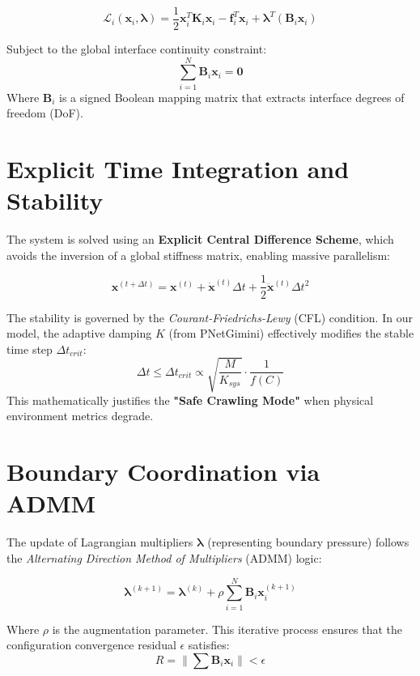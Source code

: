 \documentclass{article}
\begin{document}
\begin{equation}
\mathcal{L}_i(\mathbf{x}_i, \bm{\lambda}) = \frac{1}{2}\mathbf{x}_i^T \mathbf{K}_i \mathbf{x}_i - \mathbf{f}_i^T \mathbf{x}_i + \bm{\lambda}^T (\mathbf{B}_i \mathbf{x}_i)
\end{equation}

Subject to the global interface continuity constraint:
\begin{equation}
\sum_{i=1}^{N} \mathbf{B}_i \mathbf{x}_i = \mathbf{0}
\end{equation}
Where $\mathbf{B}_i$ is a signed Boolean mapping matrix that extracts interface degrees of freedom (DoF).

\section{Explicit Time Integration and Stability}
The system is solved using an \textbf{Explicit Central Difference Scheme}, which avoids the inversion of a global stiffness matrix, enabling massive parallelism:

\begin{equation}
\mathbf{x}^{(t+\Delta t)} = \mathbf{x}^{(t)} + \dot{\mathbf{x}}^{(t)}\Delta t + \frac{1}{2}\ddot{\mathbf{x}}^{(t)}\Delta t^2
\end{equation}

The stability is governed by the \textit{Courant-Friedrichs-Lewy} (CFL) condition. In our model, the adaptive damping $K$ (from PNetGimini) effectively modifies the stable time step $\Delta t_{crit}$:
\begin{equation}
\Delta t \le \Delta t_{crit} \propto \sqrt{\frac{M}{K_{sys}}} \cdot \frac{1}{f(C)}
\end{equation}
This mathematically justifies the \textbf{"Safe Crawling Mode"} when physical environment metrics degrade.

\section{Boundary Coordination via ADMM}
The update of Lagrangian multipliers $\bm{\lambda}$ (representing boundary pressure) follows the \textit{Alternating Direction Method of Multipliers} (ADMM) logic:

\begin{equation}
\bm{\lambda}^{(k+1)} = \bm{\lambda}^{(k)} + \rho \sum_{i=1}^{N} \mathbf{B}_i \mathbf{x}_i^{(k+1)}
\end{equation}

Where $\rho$ is the augmentation parameter. This iterative process ensures that the configuration convergence residual $\epsilon$ satisfies:
\begin{equation}
R = \|\sum \mathbf{B}_i \mathbf{x}_i\| < \epsilon
\end{equation}
\end{document}
